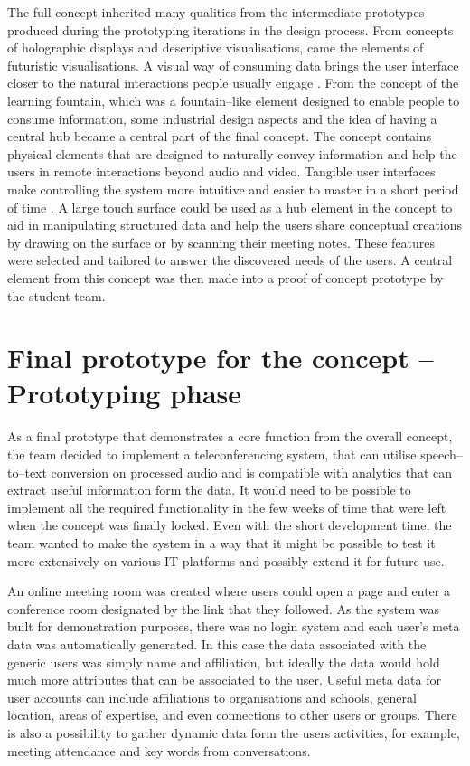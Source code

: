 \documentclass[english,12pt,a4paper,pdftex]{article}
\begin{document}
The full concept inherited many qualities from the intermediate prototypes produced during the prototyping iterations in the design process. From concepts of holographic displays and descriptive visualisations, came the elements of futuristic visualisations. A visual way of consuming data brings the user interface closer to the natural interactions people usually engage \cite{Underkoffler, Shaer}. From the concept of the learning fountain, which was a fountain--like element designed to enable people to consume information, some industrial design aspects and the idea of having a central hub became a central part of the final concept. The concept contains physical elements that are designed to naturally convey information and help the users in remote interactions beyond audio and video. Tangible user interfaces make controlling the system more intuitive and easier to master in a short period of time \cite{Shaer}. A large touch surface could be used as a hub element in the concept to aid in manipulating structured data and help the users share conceptual creations by drawing on the surface or by scanning their meeting notes. These features were selected and tailored to answer the discovered needs of the users. A central element from this concept was then made into a proof of concept prototype by the student team. 

\clearpage

\section{Final prototype for the concept -- Prototyping phase}


As a final prototype that demonstrates a core function from the overall concept, the team decided to implement a teleconferencing system, that can utilise speech--to--text conversion on processed audio and is compatible with analytics that can extract useful information form the data. It would need to be possible to implement all the required functionality in the few weeks of time that were left when the concept was finally locked. Even with the short development time, the team wanted to make the system in a way that it might be possible to test it more extensively on various IT platforms and possibly extend it for future use.

An online meeting room was created where users could open a page and enter a conference room designated by the link that they followed. As the system was built for demonstration purposes, there was no login system and each user's meta data was automatically generated. In this case the data associated with the generic users was simply name and affiliation, but ideally the data would hold much more attributes that can be associated to the user. Useful meta data for user accounts can include affiliations to organisations and schools, general location, areas of expertise, and even connections to other users or groups. There is also a possibility to gather dynamic data form the users activities, for example, meeting attendance and key words from conversations. 
\end{document}
